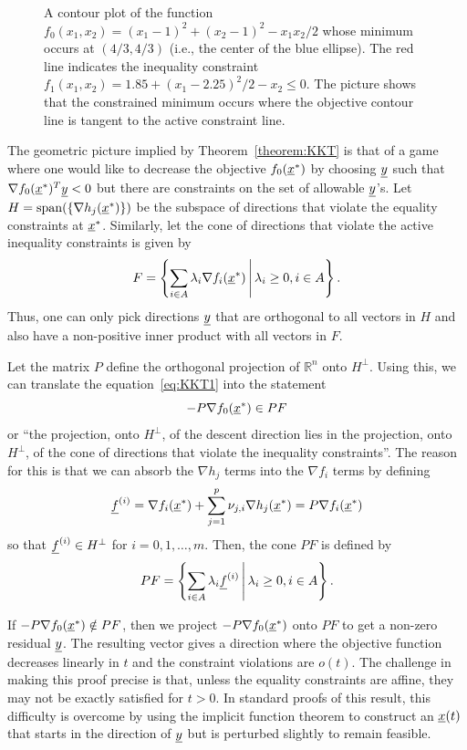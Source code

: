 \begin{figure}[t]
  \begin{center}
  \end{center}
  \caption{A contour plot of the function $f_0 (x_1,x_2) = (x_1 - 1)^2 + (x_2 - 1)^2 - x_1 x_2 /2$ whose minimum occurs at $(4/3,4/3)$ (i.e., the center of the blue ellipse).  The red line indicates the inequality constraint $f_1 (x_1,x_2)= 1.85 + (x_1 - 2.25)^2 / 2 - x_2 \leq 0$. The picture shows that the constrained minimum occurs where the objective contour line is tangent to the active constraint line.}
\end{figure}

The geometric picture implied by Theorem~\ref{theorem:KKT} is that of a game where one would like to decrease the objective $f_0 (\underline{x}^*)$ by choosing $\underline{y}$ such that $\nabla f_0 (\underline{x}^*)^T \underline{y}  < 0$ but there are  constraints on the set of allowable $\underline{y}$'s.
Let $H = \mathrm{span} ( \{ \nabla h_j (\underline{x}^*) \})$ be the subspace of directions that violate the equality constraints at $\underline{x}^*$.
Similarly, let the cone of directions that violate the active inequality constraints is given by
\[ F = \left\{ \sum_{i\in A} \lambda_i \nabla f_i (\underline{x}^*) \, \middle| \, \lambda_i \geq 0, i \in A   \right\}. \]
Thus, one can only pick directions $\underline{y}$ that are orthogonal to all vectors in $H$ and also have a non-positive inner product with all vectors in $F$.

Let the matrix $P$ define the orthogonal projection of $\mathbb{R}^n$ onto $H^\perp$.
Using this, we can translate the equation~\eqref{eq:KKT1} into the statement
\[ -P \nabla f_0 (\underline{x}^*) \in P F \]  or ``the projection, onto $H^\perp$, of the descent direction  lies in the projection, onto $H^\perp$, of the cone of directions that violate the inequality constraints''.
The reason for this is that we can absorb the $\nabla h_j$ terms into the $\nabla f_i$ terms by defining
\[ \underline{f}^{(i)} = \nabla f_i (\underline{x}^*) + \sum_{j=1}^p \nu_{j,i} \nabla h_j (\underline{x}^*) = P \nabla f_i (\underline{x}^*) \]
so that $\underline{f}^{(i)} \in H^{\perp}$ for $i=0,1,\ldots,m$.
Then, the cone $PF$ is defined by
\[ PF = \left\{ \sum_{i\in A} \lambda_i \underline{f}^{(i)} \, \middle| \, \lambda_i \geq 0, i\in A \right\}. \]

If $-P \nabla f_0 (\underline{x}^*) \notin P F$, then we project $-P \nabla f_0 (\underline{x}^*)$ onto $PF$ to get a non-zero residual $\underline{y}$.
The resulting vector gives a direction where the objective function decreases linearly in $t$ and the constraint violations are $o(t)$.
The challenge in making this proof precise is that, unless the equality constraints are affine, they may not be exactly satisfied for $t>0$.
In standard proofs of this result, this difficulty is overcome by using the implicit function theorem to construct an $\underline{x} (t)$ that starts in the direction of $\underline{y}$ but is perturbed slightly to remain feasible.

